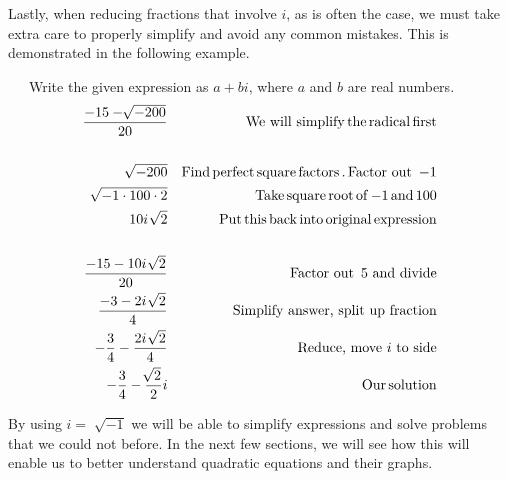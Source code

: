 Lastly, when reducing fractions that involve $i$, as is often the case, we must take extra care to properly simplify and avoid any common mistakes. This is demonstrated in the following example.

\begin{example}~~~Write the given expression as $a+bi$, where $a$ and $b$ are real numbers.
  \begin{eqnarray*}
    \frac{- 15 - \sqrt[]{- 200}}{20} &  & \operatorname{We~will~simplify} \operatorname{the}
    \operatorname{radical} \operatorname{first}\\
		& &\\
    \sqrt[]{- 200} &  & \operatorname{Find} \operatorname{perfect} \operatorname{square}
    \operatorname{factors}. \operatorname{Factor~out~} - 1\\
    \sqrt[]{- 1 \cdot 100 \cdot 2} &  & \operatorname{Take} \operatorname{square} \operatorname{root}
    \operatorname{of} - 1 \operatorname{and} 100\\
    10 i ~\sqrt[]{2} &  & \operatorname{Put} \operatorname{this} \operatorname{back} \operatorname{into}
    \operatorname{original} \operatorname{expression}\\
    & &\\
		\frac{- 15 - 10 i ~\sqrt[]{2}}{20} &  & \operatorname{Factor~out~} 5 \text{~and~divide}\\
    \frac{- 3 - 2 i ~\sqrt[]{2}}{4}& & \text{Simplify answer, split up fraction}\\
		-\frac{3}{4}-\frac{2 i ~\sqrt[]{2}}{4} & & \text{Reduce, move~} i\text{~to side}\\
		-\frac{3}{4}-\frac{\sqrt[]{2}}{2}i &  & \operatorname{Our} \operatorname{solution}
  \end{eqnarray*}
\end{example}

By using $i = \sqrt[]{- 1}$ we will be able to simplify expressions and solve problems
that we could not before. In the next few sections, we will see how this will enable us to better understand quadratic equations and their graphs.